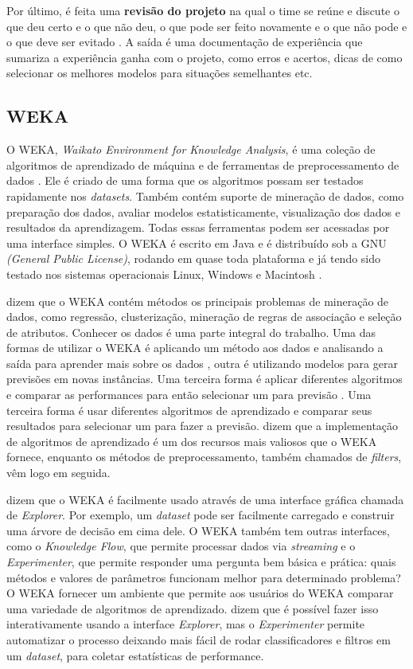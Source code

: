 Por último, é feita uma \textbf{revisão do projeto} na qual o time se reúne e discute o que deu certo e o que não deu, o que pode ser feito novamente e o que não pode e o que deve ser evitado \citep{dmfd}.
A saída é uma documentação de experiência que sumariza a experiência ganha com o projeto, como erros e acertos, dicas de como selecionar os melhores modelos para situações semelhantes etc.

\subsection{WEKA}

O WEKA, \textit{Waikato Environment for Knowledge Analysis}, é uma coleção de algoritmos de aprendizado de máquina e de ferramentas de preprocessamento de dados \citep{weka}. Ele é criado de uma forma que os algoritmos possam ser testados rapidamente nos \textit{datasets}. Também contém suporte de mineração de dados, como preparação dos dados, avaliar modelos estatisticamente, visualização dos dados e resultados da aprendizagem. Todas essas ferramentas podem ser acessadas por uma interface simples. O WEKA é escrito em Java e é distribuído sob a GNU \textit{(General Public License)}, rodando em quase toda plataforma e já tendo sido testado nos sistemas operacionais Linux, Windows e Macintosh \citep{weka}.

 dizem que o WEKA contém métodos os principais problemas de mineração de dados, como regressão, clusterização, mineração de regras de associação e seleção de atributos. Conhecer os dados é uma parte integral do trabalho. Uma das formas de utilizar o WEKA é aplicando um método aos dados e analisando a saída para aprender mais sobre os dados \citep{weka}, outra é utilizando modelos para gerar previsões em novas instâncias. Uma terceira forma é aplicar diferentes algoritmos e comparar as performances para então selecionar um para previsão . Uma terceira forma é usar diferentes algoritmos de aprendizado e comparar seus resultados para selecionar um para fazer a previsão.  dizem que a implementação de algoritmos de aprendizado é um dos recursos mais valiosos que o WEKA fornece, enquanto os métodos de preprocessamento, também chamados de \textit{filters}, vêm logo em seguida. 

 dizem que o WEKA é facilmente usado através de uma interface gráfica chamada de \textit{Explorer}. Por exemplo, um \textit{dataset} pode ser facilmente carregado e construir uma árvore de decisão em cima dele. O WEKA também tem outras interfaces, como o \textit{Knowledge Flow}, que permite processar dados via \textit{streaming} e o \textit{Experimenter}, que permite responder uma pergunta bem básica e prática: quais métodos e valores de parâmetros funcionam melhor para determinado problema? O WEKA fornecer um ambiente que permite aos usuários do WEKA comparar uma variedade de algoritmos de aprendizado.  dizem que é possível fazer isso interativamente usando a  interface \textit{Explorer}, mas o \textit{Experimenter} permite automatizar o processo deixando mais fácil de rodar classificadores e filtros em um \textit{dataset}, para coletar estatísticas de performance.

